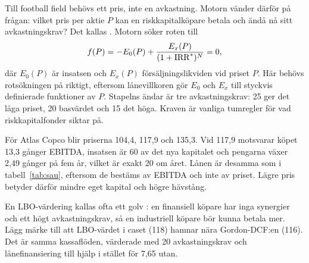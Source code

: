 Till football field behövs ett pris, inte en avkastning. Motorn vänder därför på frågan: vilket
pris per aktie $P$ kan en riskkapitalköpare betala och ändå nå sitt avkastningskrav? Det kallas
. Motorn söker roten till
\begin{equation}
  f(P) = -E_0(P) + \frac{E_x(P)}{(1 + \mathrm{IRR}^{*})^N} = 0,
  \label{eq:atp}
\end{equation}
där $E_0(P)$ är insatsen och $E_x(P)$ försäljningslikviden vid priset $P$. Här behövs
rotsökningen på riktigt, eftersom lånevillkoren gör $E_0$ och $E_x$ till styckvis definierade
funktioner av $P$. Stapelns ändar är tre avkastningskrav: 25\pct{} ger det låga priset,
20\pct{} basvärdet och 15\pct{} det höga. Kraven är vanliga tumregler för vad riskkapitalfonder
siktar på.

För Atlas Copco blir priserna 104,4, 117,9 och 135,3\kr. Vid 117,9\kr{} motsvarar köpet 13,3
gånger EBITDA, insatsen är 60\pct{} av det nya kapitalet och pengarna växer 2,49 gånger på fem
år, vilket är exakt 20\pct{} om året. Lånen är desamma som i tabell~\ref{tab:sau}, eftersom de
bestäms av EBITDA och inte av priset. Lägre pris betyder därför mindre eget kapital och högre
hävstång.

\begin{intervjutips}
En LBO-värdering kallas ofta ett golv : en finansiell köpare har inga
synergier och ett högt avkastningskrav, så en industriell köpare bör kunna betala mer. Lägg
märke till att LBO-värdet i caset (118\kr) hamnar nära Gordon-DCF:en (116\kr). Det är samma
kassaflöden, värderade med 20\pct{} avkastningskrav och lånefinansiering till hjälp i stället
för 7,65\pct{} utan.
\end{intervjutips}
